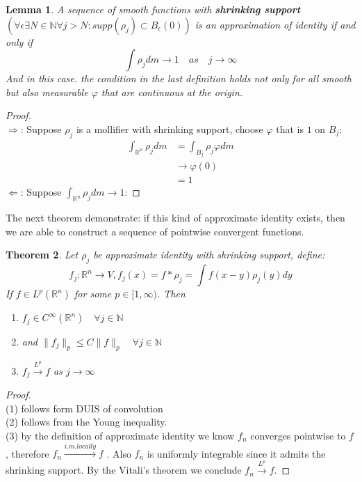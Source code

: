 \documentclass[a4paper,11pt,fleqn]{book}
\newtheorem{theorem}{Theorem}[section]
\newtheorem{lemma}[theorem]{Lemma}
\theoremstyle{definition}
\theoremstyle{remark}
\begin{document}
\begin{lemma}
	A sequence of smooth functions with \textbf{shrinking support}$(\forall \epsilon \exists N \in \mathbb{N} \forall j > N: supp(\rho_j) \subset B_\epsilon(0))$ is an approximation of identity if and only if
	\begin{equation*}
		\int \rho_j dm \rightarrow 1 \quad as \quad j \rightarrow \infty
	\end{equation*}
	And in this case. the condition in the last definition holds not only for all smooth but also measurable $\varphi$ that are continuous at the origin.
\end{lemma}
\begin{proof}\quad\\
$\Rightarrow$: Suppose $\rho_j$ is a mollifier with shrinking support, choose $\varphi$ that is $1$ on $B_j$:
\begin{align*}
	\int_{\mathbb{R}^n} \rho_j dm &= \int_{B_j} \rho_j \varphi dm\\
	&\rightarrow \varphi(0) \\
	&= 1
\end{align*}
$\Leftarrow$: Suppose $\int_{\mathbb{R}^n} \rho_j dm \rightarrow 1$:
	
\end{proof}

The next theorem demonstrate: if this kind of approximate identity exists, then we are able to construct a sequence of pointwise convergent functions.

\begin{theorem}
	Let $\rho_j$ be approximate identity with shrinking support,  define:
	\begin{equation*}
		f_j: \mathbb{R}^n \rightarrow V, f_j(x) = f * \rho_j = \int f(x-y)\rho_j(y) dy
	\end{equation*}
	If $f \in L^p(\mathbb{R}^n)$ for some $p \in [1, \infty)$. Then 
	\begin{enumerate}
		\item $f_j \in C^\infty (\mathbb{R}^n) \quad \forall j \in \mathbb{N}$ 
		\item and $\|f_j\|_p \leq C \|f\|_p \quad \forall j \in \mathbb{N} $
		\item  $f_j \overset{L^p}{\rightarrow} f$ as $j \rightarrow \infty$ 
	\end{enumerate}
\end{theorem}
\begin{proof}\quad\\
(1) follows form DUIS of convolution \\
(2) follows from the Young inequality.\\ 
(3) by the definition of approximate identity we know $f_n$ converges pointwise to $f$, therefore $f_n \overset{i.m. locally}{\longrightarrow}f$ . Also $f_n$ is uniformly integrable since it admits the shrinking support. By the Vitali's theorem we conclude $f_n \overset{L^p}{\longrightarrow} f$.
\end{proof}
\end{document}
